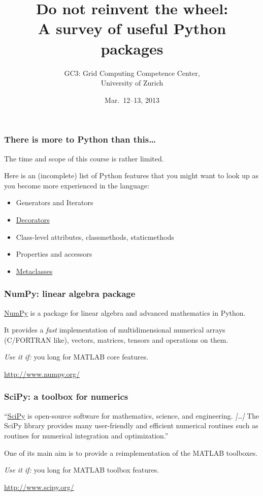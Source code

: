 \documentclass[english,serif,mathserif,xcolor=pdftex,dvipsnames,table]{beamer}
\title[Introduction]{%
  Do not reinvent the wheel:
  \\
  A survey of useful Python packages
}
\author[GC3]{%
  GC3: Grid Computing Competence Center, \\
  University of Zurich
}
\date{Mar.~12--13, 2013}
\begin{document}
\maketitle

\begin{frame}
  \frametitle{There is more to Python than this\ldots}

  The time and scope of this course is rather limited.

  \+
  Here is an (incomplete) list of Python features that you might
  want to look up as you become more experienced in the language:
  \begin{itemize}
  \item Generators and Iterators
  \item \href{http://www.artima.com/weblogs/viewpost.jsp?thread=240808}{Decorators}
  \item Class-level attributes, classmethods, staticmethods
  \item Properties and accessors
  \item \href{http://stackoverflow.com/a/6581949/459543}{Metaclasses}
  \end{itemize}
\end{frame}


\begin{frame}
  \frametitle{NumPy: linear algebra package}

  \href{http://www.numpy.org/}{NumPy} is a package for linear algebra
  and advanced mathematics in Python.

  \+ It provides a \emph{fast} implementation of multidimensional
  numerical arrays (C/FORTRAN like), vectors, matrices, tensors and
  operations on them.

  \+ \emph{Use it if:} you long for MATLAB core features.

  \begin{seealso}
    \url{http://www.numpy.org/}
  \end{seealso}
\end{frame}


\begin{frame}
  \frametitle{SciPy: a toolbox for numerics}

  ``\href{http://www.scipy.org}{SciPy} is open-source software for
  mathematics, science, and engineering. \emph{[\ldots]} The SciPy
  library provides many user-friendly and efficient numerical routines
  such as routines for numerical integration and optimization.''

  \+ One of its main aim is to provide a reimplementation of the
  MATLAB toolboxes.

  \+ \emph{Use it if:} you long for MATLAB toolbox features.

  \begin{seealso}
    \url{http://www.scipy.org/}
  \end{seealso}
\end{frame}
\end{document}
